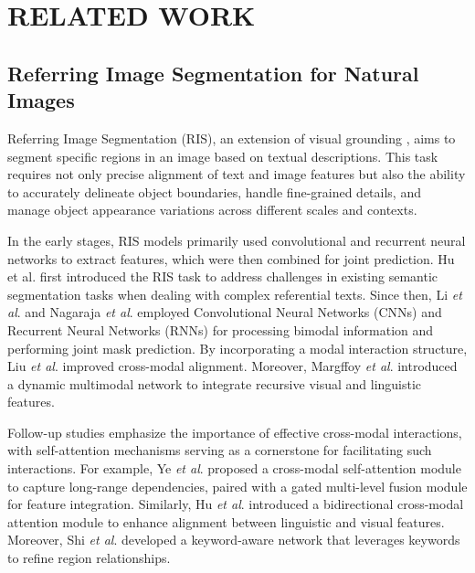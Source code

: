 \section{RELATED WORK}
\subsection{Referring Image Segmentation for Natural Images}
Referring Image Segmentation (RIS), an extension of visual grounding \cite{yang2019fast,deng2021transvg}, aims to segment specific regions in an image based on textual descriptions. This task requires not only precise alignment of text and image features but also the ability to accurately delineate object boundaries, handle fine-grained details, and manage object appearance variations across different scales and contexts.

In the early stages, RIS models primarily used convolutional and recurrent neural networks to extract features, which were then combined for joint prediction. Hu et al. first introduced the RIS task to address challenges in existing semantic segmentation tasks when dealing with complex referential texts\cite{hu2016segmentation}. Since then, Li \textit{et al}. and Nagaraja \textit{et al}. employed Convolutional Neural Networks (CNNs) and Recurrent Neural Networks (RNNs) for processing bimodal information and performing joint mask prediction\cite{li2018rrn,nagaraja2016modeling}. By incorporating a modal interaction structure, Liu \textit{et al}. improved cross-modal alignment\cite{liu2017recurrent}. Moreover, Margffoy \textit{et al}. introduced a dynamic multimodal network to integrate recursive visual and linguistic features\cite{margffoy2018dynamic}.

Follow-up studies emphasize the importance of effective cross-modal interactions, with self-attention mechanisms serving as a cornerstone for facilitating such interactions. For example, Ye \textit{et al}. proposed a cross-modal self-attention module to capture long-range dependencies, paired with a gated multi-level fusion module for feature integration\cite{ye2019cross}. Similarly, Hu \textit{et al}. introduced a bidirectional cross-modal attention module to enhance alignment between linguistic and visual features\cite{hu2020bi}. Moreover, Shi \textit{et al}. developed a keyword-aware network that leverages keywords to refine region relationships\cite{shi2018key}.

